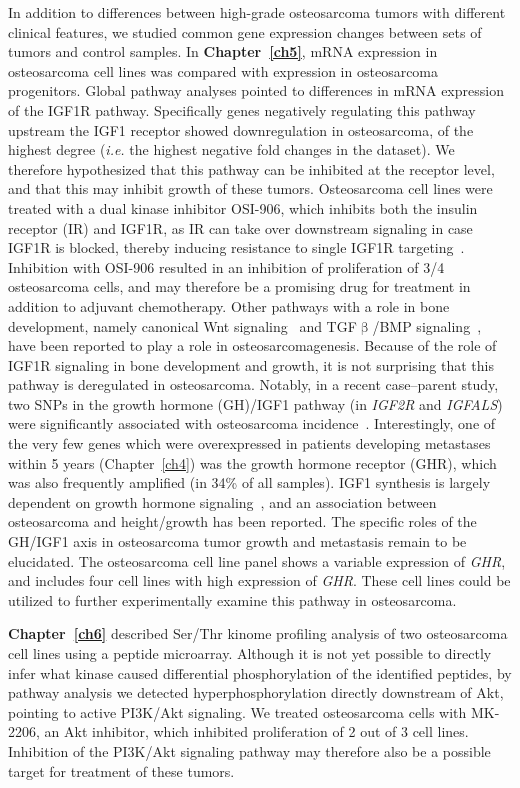 In addition to differences between high\hyp{}grade osteosarcoma tumors with different clinical features, we studied common gene expression changes between sets of tumors and control samples. In {\bf Chapter~\ref{ch5}}, mRNA expression in osteosarcoma cell lines was compared with expression in osteosarcoma progenitors. Global pathway analyses pointed to differences in mRNA expression of the IGF1R pathway. Specifically genes negatively regulating this pathway upstream the IGF1 receptor showed downregulation in osteosarcoma, of the highest degree ({\it i.e.} the highest negative fold changes in the dataset). We therefore hypothesized that this pathway can be inhibited at the receptor level, and that this may inhibit growth of these tumors. Osteosarcoma cell lines were treated with a dual kinase inhibitor OSI-906, which inhibits both the insulin receptor (IR) and IGF1R, as IR can take over downstream signaling in case IGF1R is blocked, thereby inducing resistance to single IGF1R targeting~\cite{fulzele2007disruption,garofalo2011efficacy}. Inhibition with OSI-906 resulted in an inhibition of proliferation of 3/4 osteosarcoma cells, and may therefore be a promising drug for treatment in addition to adjuvant chemotherapy. Other pathways with a role in bone development, namely canonical Wnt signaling~\cite{cai2010inactive} and TGF$\upbeta$/BMP signaling~\cite{mohseny2012activities}, have been reported to play a role in osteosarcomagenesis. Because of the role of IGF1R signaling in bone development and growth, it is not surprising that this pathway is deregulated in osteosarcoma. Notably, in a recent case--parent study, two SNPs in the growth hormone (GH)/IGF1 pathway (in {\it IGF2R} and {\it IGFALS}) were significantly associated with osteosarcoma incidence~\cite{musselman2012case}. Interestingly, one of the very few genes which were overexpressed in patients developing metastases within 5 years (Chapter~\ref{ch4}) was the growth hormone receptor (GHR), which was also frequently amplified (in 34\% of all samples). IGF1 synthesis is largely dependent on growth hormone signaling~\cite{khandwala2000effects}, and an association between osteosarcoma and height/growth has been reported. The specific roles of the GH/IGF1 axis in osteosarcoma tumor growth and metastasis remain to be elucidated. The osteosarcoma cell line panel shows a variable expression of {\it GHR}, and includes four cell lines with high expression of {\it GHR}. These cell lines could be utilized to further experimentally examine this pathway in osteosarcoma.

{\bf Chapter~\ref{ch6}} described Ser/Thr kinome profiling analysis of two osteosarcoma cell lines using a peptide microarray. Although it is not yet possible to directly infer what kinase caused differential phosphorylation of the identified peptides, by pathway analysis we detected hyperphosphorylation directly downstream of Akt, pointing to active PI3K/Akt signaling. We treated osteosarcoma cells with MK-2206, an Akt inhibitor, which inhibited proliferation of 2 out of 3 cell lines. Inhibition of the PI3K/Akt signaling pathway may therefore also be a possible target for treatment of these tumors.

